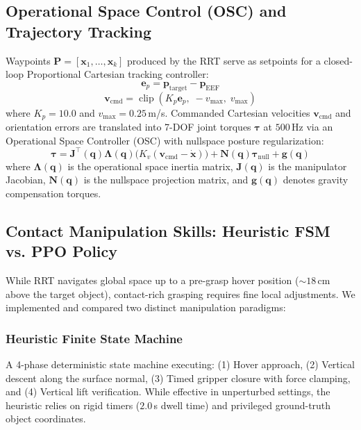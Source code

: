 \documentclass[conference]{IEEEtran}
\begin{document}
\subsection{Operational Space Control (OSC) and Trajectory Tracking}
Waypoints $\mathbf{P} = [\mathbf{x}_1, \dots, \mathbf{x}_k]$ produced by the RRT serve as setpoints for a closed-loop Proportional Cartesian tracking controller:
\begin{equation}
    \mathbf{e}_p = \mathbf{p}_{\text{target}} - \mathbf{p}_{\text{EEF}}
\end{equation}
\begin{equation}
    \mathbf{v}_{\text{cmd}} = \operatorname{clip}(K_p \mathbf{e}_p,\; -v_{\max},\; v_{\max})
\end{equation}
where $K_p = 10.0$ and $v_{\max} = 0.25$\,m/s. Commanded Cartesian velocities $\mathbf{v}_{\text{cmd}}$ and orientation errors are translated into 7-DOF joint torques $\boldsymbol{\tau}$ at $500$\,Hz via an Operational Space Controller (OSC) with nullspace posture regularization:
\begin{equation}
    \boldsymbol{\tau} = \mathbf{J}^\top(\mathbf{q}) \boldsymbol{\Lambda}(\mathbf{q}) \Big( K_v (\mathbf{v}_{\text{cmd}} - \dot{\mathbf{x}}) \Big) + \mathbf{N}(\mathbf{q}) \boldsymbol{\tau}_{\text{null}} + \mathbf{g}(\mathbf{q})
\end{equation}
where $\boldsymbol{\Lambda}(\mathbf{q})$ is the operational space inertia matrix, $\mathbf{J}(\mathbf{q})$ is the manipulator Jacobian, $\mathbf{N}(\mathbf{q})$ is the nullspace projection matrix, and $\mathbf{g}(\mathbf{q})$ denotes gravity compensation torques.

\subsection{Contact Manipulation Skills: Heuristic FSM vs. PPO Policy}
While RRT navigates global space up to a pre-grasp hover position ($\sim 18$\,cm above the target object), contact-rich grasping requires fine local adjustments. We implemented and compared two distinct manipulation paradigms:

\subsubsection{Heuristic Finite State Machine}
A 4-phase deterministic state machine executing: (1) Hover approach, (2) Vertical descent along the surface normal, (3) Timed gripper closure with force clamping, and (4) Vertical lift verification. While effective in unperturbed settings, the heuristic relies on rigid timers ($2.0$\,s dwell time) and privileged ground-truth object coordinates.
\end{document}
